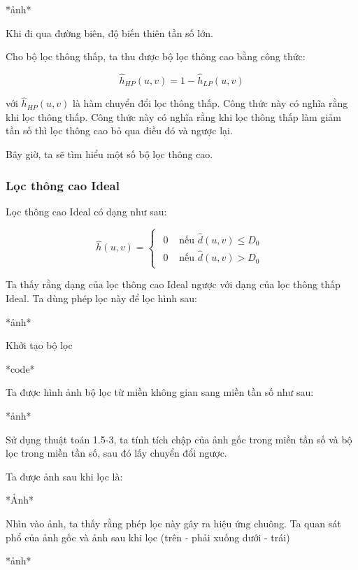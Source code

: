 \documentclass[12pt,a4paper]{report}
\numberwithin{equation}{section}
\theoremstyle{definition} %
\begin{document}
*ảnh*

Khi đi qua đường biên, độ biến thiên tần số lớn.

Cho bộ lọc thông thấp, ta thu được bộ lọc thông cao bằng công thức:

\begin{equation}
    \hat{h}_{HP}(u,v) = 1 - \hat{h}_{LP}(u,v)
\end{equation}

với $\hat{h}_{HP}(u,v)$ là hàm chuyển đổi lọc thông thấp. Công thức này có nghĩa rằng khi lọc thông thấp. Công thức này có nghĩa rằng khi lọc thông thấp làm giảm tần số thì lọc thông cao bỏ qua điều đó và ngược lại.

Bây giờ, ta sẽ tìm hiểu một số bộ lọc thông cao.

\subsubsection{Lọc thông cao Ideal}

Lọc thông cao Ideal có dạng như sau:

\begin{equation}
    \hat{h}(u,v)=\begin{cases}
    \begin{aligned}
        0& \text{ nếu }  \hat{d}(u,v) \le D_0\\
        0& \text{ nếu }  \hat{d}(u,v) > D_0
    \end{aligned}
\end{cases}
\end{equation}


Ta thấy rằng dạng của lọc thông cao Ideal ngược với dạng của lọc thông thấp Ideal. Ta dùng phép lọc này để lọc hình sau: 

*ảnh*

Khởi tạo bộ lọc 

*code*

Ta được hình ảnh bộ lọc từ miền không gian sang miền tần số như sau:

*ảnh*

Sử dụng thuật toán 1.5-3, ta tính tích chập của ảnh gốc trong miền tần số và bộ lọc trong miền tần số, sau đó lấy chuyển đổi ngược.

Ta được ảnh sau khi lọc là:

*Ảnh*

Nhìn vào ảnh, ta thấy rằng phép lọc này gây ra hiệu ứng chuông. Ta quan sát phổ của ảnh gốc và ảnh sau khi lọc (trên - phải xuống dưới - trái)

*ảnh*
\end{document}
